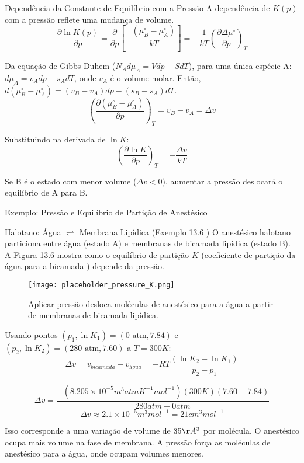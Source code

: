 \documentclass{beamer}
\begin{document}
\begin{frame}{Dependência da Constante de Equilíbrio com a Pressão}
    A dependência de $K(p)$ com a pressão reflete uma mudança de volume. 
    $$ \frac{\partial \ln K(p)}{\partial p} = \frac{\partial}{\partial p}\left[-\frac{(\mu_B^{\circ} - \mu_A^{\circ})}{kT}\right] = -\frac{1}{kT}\left(\frac{\partial \Delta\mu^{\circ}}{\partial p}\right)_T $$
     
    Da equação de Gibbs-Duhem ($N_A d\mu_A = Vdp - SdT$), para uma única espécie A: $d\mu_A = v_A dp - s_A dT$, onde $v_A$ é o volume molar.  
    Então, $d(\mu_B^{\circ} - \mu_A^{\circ}) = (v_B - v_A)dp - (s_B - s_A)dT$. 
    $$ \left(\frac{\partial(\mu_B^{\circ} - \mu_A^{\circ})}{\partial p}\right)_T = v_B - v_A = \Delta v $$
     
    Substituindo na derivada de $\ln K$:
    $$ \left(\frac{\partial \ln K}{\partial p}\right)_T = -\frac{\Delta v}{kT} $$
    
    Se B é o estado com menor volume ($\Delta v < 0$), aumentar a pressão deslocará o equilíbrio de A para B. 
\end{frame}

\begin{frame}{Exemplo: Pressão e Equilíbrio de Partição de Anestésico}
    \begin{exampleblock}{Halotano: Água $\rightleftharpoons$ Membrana Lipídica (Exemplo 13.6 )}
        O anestésico halotano particiona entre água (estado A) e membranas de bicamada lipídica (estado B). 
        A Figura 13.6 mostra como o equilíbrio de partição $K$ (coeficiente de partição da água para a bicamada ) depende da pressão. 
        \begin{figure}
        \centering
        \texttt{[image: placeholder\_pressure\_K.png]}
        \caption{Aplicar pressão desloca moléculas de anestésico para a água a partir de membranas de bicamada lipídica. }
        \end{figure}
        
        Usando pontos $(p_1, \ln K_1) = (0 \text{ atm}, 7.84)$ e $(p_2, \ln K_2) = (280 \text{ atm}, 7.60)$ a $T=300K$: 
        $$ \Delta v = v_{bicamada} - v_{água} = -RT \frac{(\ln K_2 - \ln K_1)}{p_2 - p_1} $$
        
        $$ \Delta v = \frac{-(8.205 \times 10^{-5} m^3 atm K^{-1} mol^{-1})(300K)(7.60 - 7.84)}{280 atm - 0 atm} $$
        $$ \Delta v \approx 2.1 \times 10^{-5} m^3 mol^{-1} = 21 cm^3 mol^{-1} $$
        
        Isso corresponde a uma variação de volume de $35 \AA^3$ por molécula.  O anestésico ocupa mais volume na fase de membrana.  A pressão força as moléculas de anestésico para a água, onde ocupam volumes menores. 
    \end{exampleblock}
\end{frame}
\end{document}
